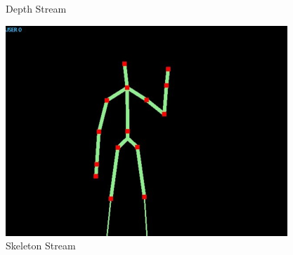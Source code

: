 \begin{frame}
\begin{figure}[ht!]
\begin{minipage}{0.32\textwidth}
    Depth Stream
  \end{minipage}\hfill
  \begin{minipage}{0.32\textwidth}
  	\centering
    \includegraphics[width=\textwidth]{figs/skeleton-frame}\\
    Skeleton Stream
  \end{minipage}
\end{figure}

\end{frame}


